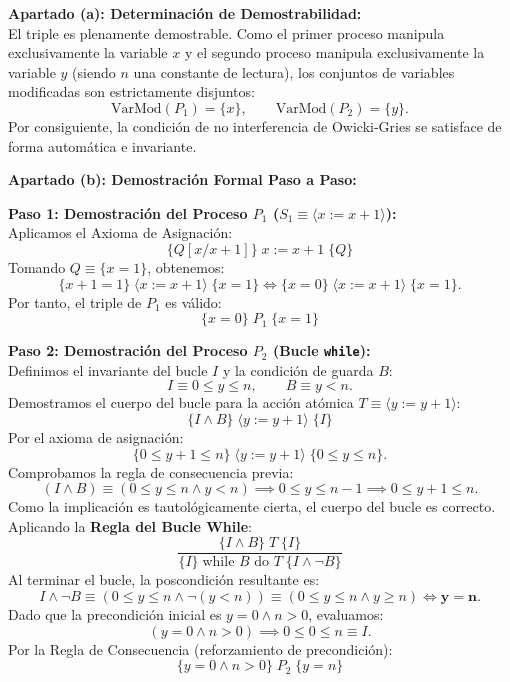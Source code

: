 \documentclass[11pt,a4paper,twoside,openright]{report}
\begin{document}
\begin{solucion}
\textbf{Apartado (a): Determinación de Demostrabilidad:}\\
El triple es plenamente demostrable. Como el primer proceso manipula exclusivamente la variable $x$ y el segundo proceso manipula exclusivamente la variable $y$ (siendo $n$ una constante de lectura), los conjuntos de variables modificadas son estrictamente disjuntos:
\[
\text{VarMod}(P_1) = \{x\}, \qquad \text{VarMod}(P_2) = \{y\}.
\]
Por consiguiente, la condición de no interferencia de Owicki-Gries se satisface de forma automática e invariante.

\textbf{Apartado (b): Demostración Formal Paso a Paso:}

\textbf{Paso 1: Demostración del Proceso $P_1$ ($S_1 \equiv \langle x := x + 1 \rangle$):}\\
Aplicamos el Axioma de Asignación:
\[
\{Q[x/x+1]\} \; x := x + 1 \; \{Q\}
\]
Tomando $Q \equiv \{x = 1\}$, obtenemos:
\[
\{x + 1 = 1\} \; \langle x := x + 1 \rangle \; \{x = 1\} \iff \{x = 0\} \; \langle x := x + 1 \rangle \; \{x = 1\}.
\]
Por tanto, el triple de $P_1$ es válido:
\[
\boxed{\{x = 0\} \; P_1 \; \{x = 1\}}
\]

\textbf{Paso 2: Demostración del Proceso $P_2$ (Bucle \texttt{while}):}\\
Definimos el invariante del bucle $I$ y la condición de guarda $B$:
\[
I \equiv 0 \le y \le n, \qquad B \equiv y < n.
\]
Demostramos el cuerpo del bucle para la acción atómica $T \equiv \langle y := y + 1 \rangle$:
\[
\{I \land B\} \; \langle y := y + 1 \rangle \; \{I\}
\]
Por el axioma de asignación:
\[
\{0 \le y + 1 \le n\} \; \langle y := y + 1 \rangle \; \{0 \le y \le n\}.
\]
Comprobamos la regla de consecuencia previa:
\[
(I \land B) \equiv (0 \le y \le n \land y < n) \implies 0 \le y \le n - 1 \implies 0 \le y + 1 \le n.
\]
Como la implicación es tautológicamente cierta, el cuerpo del bucle es correcto. Aplicando la \textbf{Regla del Bucle While}:
\[
\frac{\{I \land B\} \; T \; \{I\}}{\{I\} \; \text{while } B \text{ do } T \; \{I \land \neg B\}}
\]
Al terminar el bucle, la poscondición resultante es:
\[
I \land \neg B \equiv (0 \le y \le n \land \neg(y < n)) \equiv (0 \le y \le n \land y \ge n) \iff \mathbf{y = n}.
\]
Dado que la precondición inicial es $y = 0 \land n > 0$, evaluamos:
\[
(y = 0 \land n > 0) \implies 0 \le 0 \le n \equiv I.
\]
Por la Regla de Consecuencia (reforzamiento de precondición):
\[
\boxed{\{y = 0 \land n > 0\} \; P_2 \; \{y = n\}}
\]


\end{solucion}
\end{document}
